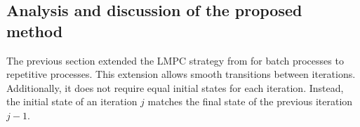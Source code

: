 \subsection{Analysis and discussion of the proposed method}
The previous section extended the LMPC strategy from \cite{Rosolia2016} for batch processes to repetitive processes. This extension allows smooth transitions between iterations. Additionally, it does not require equal initial states for each iteration. Instead, the initial state of an iteration $j$ matches the final state of the previous iteration $j-1$.\\


